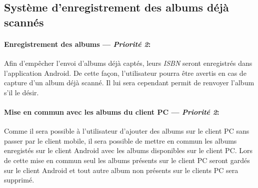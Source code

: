 \subsection{Système d'enregistrement des albums déjà scannés}
\paragraph{Enregistrement des albums ---  \textit{Priorité 2}:} 
Afin d'empêcher l'envoi d'albums déjà captés, leurs \emph{ISBN} seront enregistrés dans l'application Android. 
De cette façon, l'utilisateur pourra être avertis en cas de capture d'un album déjà scanné.
Il lui sera cependant permit de renvoyer l'album s'il le désir.

\paragraph{Mise en commun avec les albums du client PC ---  \textit{Priorité 2}:} 
Comme il sera possible à l'utilisateur d'ajouter des albums sur le client PC sans passer par le client mobile, il sera possible de mettre en commun les albums enregistés sur le client Android avec les albums disponibles sur le client PC.
Lors de cette mise en commun seul les albums présents sur le client PC seront gardés sur le client Android et tout autre album non présents sur le clients PC sera supprimé.  

